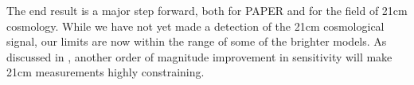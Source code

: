 \documentclass[twocolumn,numberedappendix]{emulateapj} \shorttitle{PSA64}
\begin{document}
The end result is a major step forward, both for PAPER and for the field of 21cm cosmology.
While we have not yet made a detection of the 21cm cosmological signal, our limits are
now within the range of some of the brighter models.  As discussed in \citet{pober_et_al2015},
another order of magnitude improvement in sensitivity will make 21cm measurements highly constraining.



%
%
%
\end{document}
